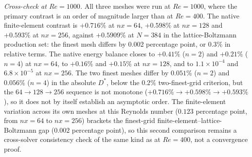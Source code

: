 \emph{Cross-check at $Re=1000$.} All three meshes were run at $Re=1000$, where the primary contrast is an order of magnitude larger than at $Re=400$. The native finite-element contrast is $+0.716\%$ at $nx=64$, $+0.598\%$ at $nx=128$ and $+0.593\%$ at $nx=256$, against $+0.5909\%$ at $N=384$ in the lattice-Boltzmann production set: the finest mesh differs by $0.002$ percentage point, or $0.3\%$ in relative terms. The native energy balance closes to $+0.41\%$ ($n=2$) and $+0.21\%$ ($n=4$) at $nx=64$, to $+0.16\%$ and $+0.15\%$ at $nx=128$, and to $1.1\times10^{-4}$ and $6.8\times10^{-5}$ at $nx=256$. The two finest meshes differ by $0.051\%$ ($n=2$) and $0.056\%$ ($n=4$) in the absolute $D^*$, below the $0.2\%$ two-finest-grid criterion, but the $64\to128\to256$ sequence is not monotone ($+0.716\%\to+0.598\%\to+0.593\%$), so it does not by itself establish an asymptotic order. The finite-element variation across its own meshes at this Reynolds number ($0.123$ percentage point, from $nx=64$ to $nx=256$) brackets the finest-grid finite-element--lattice-Boltzmann gap ($0.002$ percentage point), so this second comparison remains a cross-solver consistency check of the same kind as at $Re=400$, not a convergence proof.

